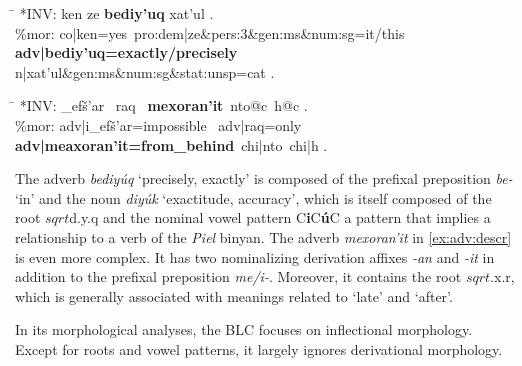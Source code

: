 \begin{exe}
\ex \label{ex:adv:bediyuq}
	\begin{tabbing}
	\hspace{0.6in} \= \hspace{5.5in} \kill
	\textsf{*INV:} \> \textsf{ken ze \textbf{bediy\a'{u}q} xat\a'{u}l .} \\
	\textsf{\%mor:} \> \textsf{co|ken=yes\, pro:dem|ze\&pers:3\&gen:ms\&num:sg=it/this} \\
				\> \textsf{\textbf{adv|bediy\a'{u}q=exactly/precisely}} \\
				\> \textsf{n|xat\a'{u}l\&gen:ms\&num:sg\&stat:unsp=cat .}
	\end{tabbing}
\ex \label{ex:adv:dscr}
	\begin{tabbing}
	\hspace{0.6in} \= \hspace{5.5in} \kill
	\textsf{*INV:} \> \textsf{\_{\textglotstop}{e}f\v{s}\a'{a}r \, raq \, \textbf{mexoran\a'{i}t}\, 
		nto@c\, h@c .} \\
	\textsf{\%mor:} \> \textsf{adv|{\textglotstop}i\_{\textglotstop}ef\v{s}\a'{a}r=impossible \, adv|raq=only}\\
	 \> \textsf{\textbf{adv|me{\textglotstop}axoran\a'{i}t=from\_behind}\, chi|nto\, chi|h .}
	\end{tabbing}
\end{exe}

The adverb \textit{bediy\'uq} `precisely, exactly'
is composed of the prefixal preposition \textit{be-} `in' and the 
noun \textit{diy\'uk} `exactitude, accuracy', which is itself composed of the 
root $sqrt$d.y.q and the nominal vowel pattern C\textbf{i}C\textbf{\'u}C 
a pattern that implies a relationship to a verb of the \textit{Piel} binyan.  
The adverb \textit{\textsf{mexoran\a'{i}t}} in \ref{ex:adv:descr} 
is even more complex. It has two nominalizing
derivation affixes \textit{\textsf{-an}} and \textit{\textsf{-it}} in addition 
to the prefixal preposition \textit{\textsf{me/i-}}. Moreover, it contains the 
root $sqrt$\textsf{.x.r}, which is generally associated with meanings 
related to `late' and `after'.

In its morphological analyses, the BLC focuses on inflectional morphology. 
Except for roots and vowel patterns, it largely ignores derivational morphology.


